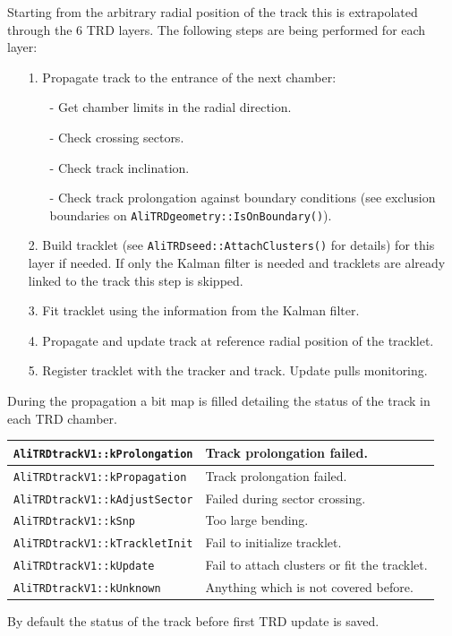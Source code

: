 \documentclass{alicetdr}
\begin{document}
Starting from the arbitrary radial position of the track this is
extrapolated through the 6 TRD layers. The following steps
are being performed for each layer:
\begin{itemize}
\item[1.] Propagate track to the entrance of the next chamber:
  \begin{itemize}
  \item[-] Get chamber limits in the radial direction.
  \item[-] Check crossing sectors.
  \item[-] Check track inclination.
  \item[-] Check track prolongation against boundary conditions (see exclusion
           boundaries on {\tt AliTRDgeometry::IsOnBoundary()}).
  \end{itemize}
\item[2.] Build tracklet (see {\tt AliTRDseed::AttachClusters()} for details) for
          this layer if needed. If only the Kalman filter is needed and tracklets
          are already linked to the track this step is skipped.
\item[3.] Fit tracklet using the information from the Kalman filter.
\item[4.] Propagate and update track at reference radial position of the tracklet.
\item[5.] Register tracklet with the tracker and track. Update pulls monitoring.
\end{itemize}

During the propagation a bit map is filled detailing the status of the track in
each TRD chamber.
\begin{center}
\begin{tabular}{|l|l|}  \hline
{\tt AliTRDtrackV1::kProlongation} & Track prolongation failed.                   \\ \hline
{\tt AliTRDtrackV1::kPropagation}  & Track prolongation failed.                   \\ \hline
{\tt AliTRDtrackV1::kAdjustSector} & Failed during sector crossing.               \\ \hline
{\tt AliTRDtrackV1::kSnp}          & Too large bending.                           \\ \hline
{\tt AliTRDtrackV1::kTrackletInit} & Fail to initialize tracklet.                 \\ \hline
{\tt AliTRDtrackV1::kUpdate}       & Fail to attach clusters or fit the tracklet. \\ \hline
{\tt AliTRDtrackV1::kUnknown}      & Anything which is not covered before.        \\ \hline
\end{tabular}
\end{center}
By default the status of the track before first TRD update is saved.
\end{document}
